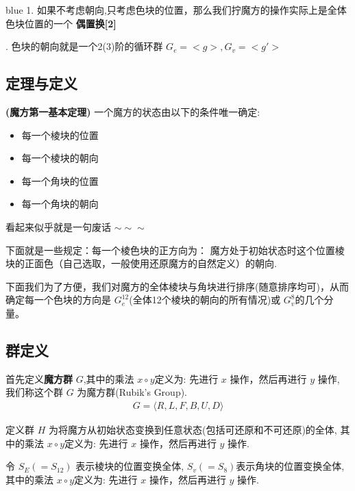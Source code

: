 \documentclass[12pt]{article}
\begin{document}
\begin{formal}{blue}
    1. 如果不考虑朝向,只考虑色块的位置，那么我们拧魔方的操作实际上是全体色块位置的一个 {\bf 偶置换[2]}

    . 色块的朝向就是一个2(3)阶的循环群 $G_e = <g>, G_v = <g'>$
\end{formal}

\subsection{定理与定义}
\begin{framed}
{\bf (魔方第一基本定理)}\kaishu 
一个魔方的状态由以下的条件唯一确定:
\begin{multicols}{2}
    \begin{itemize}
        \item 每一个棱块的位置
        \item 每一个棱块的朝向
        \item 每一个角块的位置
        \item 每一个角块的朝向
    \end{itemize}
\end{multicols}

看起来似乎就是一句废话 $\sim\sim\sim$
\end{framed}

下面就是一些规定：每一个棱色块的正方向为：
魔方处于初始状态时这个位置棱块的正面色（自己选取，一般使用还原魔方的自然定义）的朝向.

下面我们为了方便，我们对魔方的全体棱块与角块进行排序(随意排序均可)，从而确定每一个色块的方向是
$G_{e}^{12}$(全体12个棱块的朝向的所有情况)或 $G_v^{8}$的几个分量。

\subsection{群定义}
首先定义{\bf 魔方群} $G$,其中的乘法 $x\circ y$定义为: 先进行 $x$ 操作，然后再进行 $y$ 操作,
我们称这个群 $G$ 为魔方群(Rubik's Group).
\begin{align}
    G = \langle R, L, F, B, U, D\rangle
\end{align}


定义群 $H$ 为将魔方从初始状态变换到任意状态(包括可还原和不可还原)的全体,
其中的乘法 $x\circ y$定义为: 先进行 $x$ 操作，然后再进行 $y$ 操作.

令 $S_E(=S_{12})$ 表示棱块的位置变换全体, $S_v(=S_8)$表示角块的位置变换全体,
其中的乘法 $x\circ y$定义为: 先进行 $x$ 操作，然后再进行 $y$ 操作.
\end{document}
